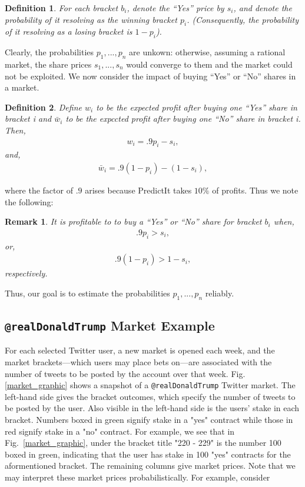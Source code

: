 \documentclass{article}
\newtheorem*{remark}{Remark}
\newtheorem{definition}{Definition}
\begin{document}
\begin{definition}
    For each bracket $b_i$, denote the ``Yes'' price by $s_i$, and denote the probability of it resolving as the winning bracket $p_i$.
    (Consequently, the probability of it resolving as a losing bracket is $1 - p_i$).
\end{definition}
Clearly, the probabilities $p_1,...,p_n$ are unkown: otherwise, assuming a rational market, the share prices $s_1,...,s_n$ would converge to them
and the market could not be exploited.
We now consider the impact of buying ``Yes'' or ``No'' shares in a market.
\begin{definition}
    Define $w_i$ to be the expected profit after buying one ``Yes'' share in bracket i and $\bar{w}_i$ to be the expccted profit after
    buying one ``No'' share in bracket i. Then,
    \begin{align*}
        w_i = .9p_i - s_i,
    \end{align*}
    \noindent and,
    \begin{align*}
        \bar{w}_i = .9(1-p_i) - (1-s_i),
    \end{align*}
\end{definition}
\noindent where the factor of $.9$ arises because PredictIt takes $10\%$ of profits.
Thus we note the following:
\begin{remark}
It is profitable to to buy a ``Yes'' or ``No'' share for bracket
$b_i$ when,
\begin{align*}
    .9p_i > s_i,
\end{align*}
\noindent or,
\begin{align*}
    .9(1-p_i) > 1- s_i,
\end{align*}
\noindent respectively.
\end{remark}
Thus, our goal is to estimate the probabilities $p_1,...,p_n$ reliably.

\subsection{\lstinline{@realDonaldTrump} Market Example}
For each selected Twitter user,
a new market is opened each week, and the market brackets---which users may place bets
on---are associated with the number of tweets to be posted by the account over that week.
Fig.\ref{market_graphic} shows a snapshot of a \lstinline{@realDonaldTrump} Twitter market.
The left-hand side gives the bracket outcomes, which specify the number of tweets to be posted by the user. Also visible
in the left-hand side is the users' stake in each bracket. Numbers boxed in green signify stake in a "yes" contract while
those in red signify stake in a "no" contract. For example, we see that in Fig.~\ref{market_graphic}, under the bracket title "220 - 229" is
the number 100 boxed in green, indicating that the user has stake in 100 "yes" contracts for the aformentioned bracket.
The remaining columns give market prices.
Note that we may interpret these market prices probabilistically. For example, consider 
\end{document}
